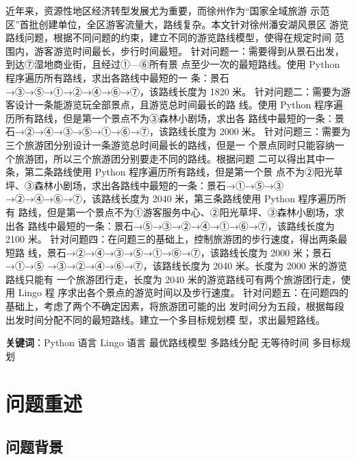 \documentclass{ctexart}
\begin{document}
{    \raggedright
    近年来，资源性地区经济转型发展尤为重要，而徐州作为“国家全域旅游
    示范区”首批创建单位，全区游客流量大，路线复杂。本文针对徐州潘安湖风景区
    游览路线问题，根据不同问题的约束，建立不同的游览路线模型，使得在规定时间
    范围内，游客游览时间最长，步行时间最短。
    针对问题一：需要得到从景石出发，到达⑦湿地商业街，且经过①—⑥所有景
    点至少一次的最短路线。使用 Python 程序遍历所有路线，求出各路线中最短的一
    条：景石→③→⑤→①→②→④→⑥→⑦，该路线长度为 1820 米。
    针对问题二：需要为游客设计一条能游览玩全部景点，且游览总时间最长的路
    线。使用 Python 程序遍历所有路线，但是第一个景点不为③森林小剧场，求出各
    路线中最短的一条：景石→②→④→③→⑤→①→⑥→⑦，该路线长度为 2000
    米。
    针对问题三：需要为三个旅游团分别设计一条游览总时间最长的路线，但是一
    个景点同时只能容纳一个旅游团，所以三个旅游团分别要走不同的路线。根据问题
    二可以得出其中一条，第二条路线使用 Python 程序遍历所有路线，但是第一个景
    点不为②阳光草坪、③森林小剧场，求出各路线中最短的一条：景石→①→⑤→③
    →②→④→⑥→⑦，该路线长度为 2040 米，第三条路线使用 Python 程序遍历所有
    路线，但是第一个景点不为①游客服务中心、②阳光草坪、③森林小剧场，求出各
    路线中最短的一条：景石→⑤→③→②→④→①→⑥→⑦，该路线长度为 2100
    米。
    针对问题四：在问题三的基础上，控制旅游团的步行速度，得出两条最短路
    线，景石→②→④→③→⑤→①→⑥→⑦，该路线长度为 2000 米；景石→①→⑤
    →③→②→④→⑥→⑦，该路线长度为 2040 米。长度为 2000 米的游览路线只能有
    一个旅游团行走，长度为 2040 米的游览路线可有两个旅游团行走，使用 Lingo 程
    序求出各个景点的游览时间以及步行速度。
    针对问题五：在问题四的基础上，考虑了两个不确定因素，将旅游团可能的出
    发时间分为五段，根据每段出发时间分配不同的最短路线。建立一个多目标规划模
    型，求出最短路线。
    \medskip
    
   
    \raggedright
    {\textbf{关键词}}：Python 语言 \hspace{1pc}Lingo 语言\hspace{1pc} 最优路线模型\hspace{1pc} 多路线分配\hspace{1pc} 无等待时间\hspace{1pc} 多目标规划
    
    
    
    
    
    \newpage
    \centering
    \section{问题重述}
	
	\subsection{问题背景}\thispagestyle{plain}
	\setcounter{page}{1}
}
\end{document}
